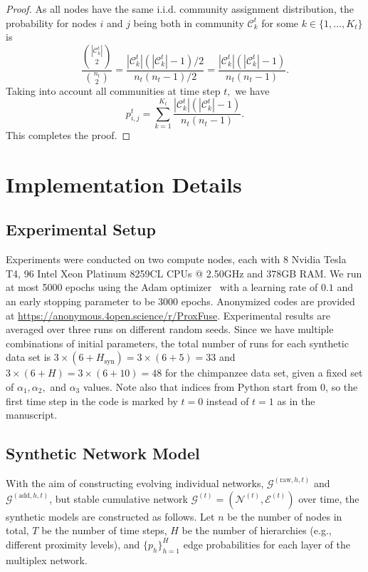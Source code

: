 \documentclass{article}
\theoremstyle{plain}
\theoremstyle{definition}
\theoremstyle{remark}
\begin{document}
\begin{proof}
As all nodes have the same i.i.d. community assignment distribution, the probability for nodes $i$ and $j$ being both in community $\mathcal{C}_k^{t}$ for some $k\in\{1, \dots, K_t\}$ is
\begin{equation*}
\frac{\binom{\left\lvert\mathcal{C}_k^{t}\right\rvert}{2}}{\binom{n_t}{2}}=\frac{\left\lvert\mathcal{C}_k^{t}\right\rvert\left(\left\lvert\mathcal{C}_k^{t}\right\rvert-1\right)/2}{n_t(n_t-1)/2}=\frac{\left\lvert\mathcal{C}_k^{t}\right\rvert\left(\left\lvert\mathcal{C}_k^{t}\right\rvert-1\right)}{n_t(n_t-1)}.
\end{equation*}
Taking into account all communities at time step $t,$ we have 
\begin{equation}
    p_{i,j}^t=\sum_{k=1}^{K_t}\frac{\left\lvert\mathcal{C}_k^{t}\right\rvert\left(\left\lvert\mathcal{C}_k^{t}\right\rvert-1\right)}{n_t(n_t-1)}.
\end{equation}
This completes the proof.
\end{proof}
\section{Implementation Details}
\label{app_sec:implementation}
\subsection{Experimental Setup}
\label{app_sec:experiment_setup}
Experiments were conducted on two compute nodes, each with 8 Nvidia Tesla T4, 96 Intel Xeon Platinum 8259CL CPUs @ 2.50GHz and $378$GB RAM. We run at most 5000 epochs using the Adam optimizer~\cite{kingma2014adam} with a learning rate of $0.1$ and an early stopping parameter to be 3000 epochs. Anonymized codes are provided at \url{https://anonymous.4open.science/r/ProxFuse}. Experimental results are averaged over three runs on different random seeds. Since we have multiple combinations of initial parameters, the total number of runs for each synthetic data set is $3\times(6+H_\text{syn})=3\times(6+5)=33$ and $3\times(6+H)=3\times(6+10)=48$ for the chimpanzee data set, given a fixed set of $\alpha_1, \alpha_2,$ and $\alpha_3$ values. Note also that indices from Python start from 0, so the first time step in the code is marked by $t=0$ instead of $t=1$ as in the manuscript.
\subsection{Synthetic Network Model}
\label{app_sec:synthetic_generation}
With the aim of constructing evolving individual networks, $\mathcal{G}^{(\text{raw}, h,t)}$ and $\mathcal{G}^{(\text{add}, h,t)}$, but stable cumulative network $\mathcal{G}^{(t)}=(\mathcal{N}^{(t)},\mathcal{E}^{(t)})$ over time, the synthetic models are constructed as follows. Let $n$ be the number of nodes in total, $T$ be the number of time steps, $H$ be the number of hierarchies (e.g., different proximity levels), and $\{p_h\}_{h=1}^H$ edge probabilities for each layer of the multiplex network. 
\end{document}
